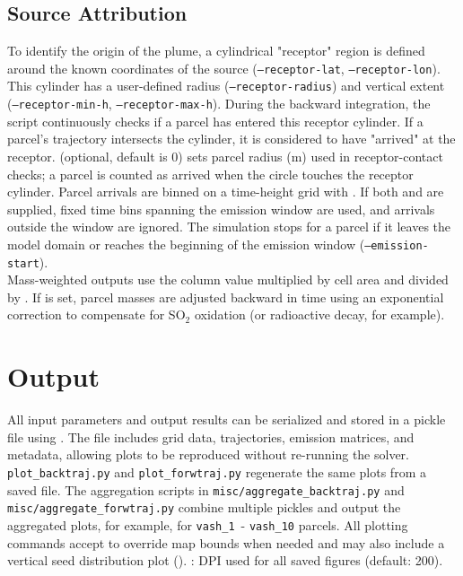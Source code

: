\documentclass[11pt]{article}
\begin{document}
\subsection{Source Attribution}
To identify the origin of the plume, a cylindrical "receptor" region is defined around the known coordinates of the source (\texttt{--receptor-lat}, \texttt{--receptor-lon}). This cylinder has a user-defined radius (\texttt{--receptor-radius}) and vertical extent (\texttt{--receptor-min-h}, \texttt{--receptor-max-h}). During the backward integration, the script continuously checks if a parcel has entered this receptor cylinder. If a parcel's trajectory intersects the cylinder, it is considered to have "arrived" at the receptor.  (optional, default is 0) sets parcel radius (m) used in receptor-contact checks; a parcel is counted as arrived when the circle touches the receptor cylinder. Parcel arrivals are binned on a time-height grid with . If both  and  are supplied, fixed time bins spanning the emission window are used, and arrivals outside the window are ignored. The simulation stops for a parcel if it leaves the model domain or reaches the beginning of the emission window (\texttt{--emission-start}).
\\
Mass-weighted outputs use the column value multiplied by cell area and divided by . If  is set, parcel masses are adjusted backward in time using an exponential correction to compensate for SO$_2$ oxidation (or radioactive decay, for example).


\section{Output}
All input parameters and output results can be serialized and stored in a pickle file using . The file includes grid data, trajectories, emission matrices, and metadata, allowing plots to be reproduced without re-running the solver. \texttt{plot\_backtraj.py} and \texttt{plot\_forwtraj.py} regenerate the same plots from a saved  file. The aggregation scripts in \texttt{misc/aggregate\_backtraj.py} and \texttt{misc/aggregate\_forwtraj.py} combine multiple pickles and output the aggregated plots, for example, for \texttt{vash\_1}\ - \texttt{vash\_{10}} parcels. All plotting commands accept  to override map bounds when needed and may also include a vertical seed distribution plot (). 
: DPI used for all saved figures (default: 200).\\
\end{document}
